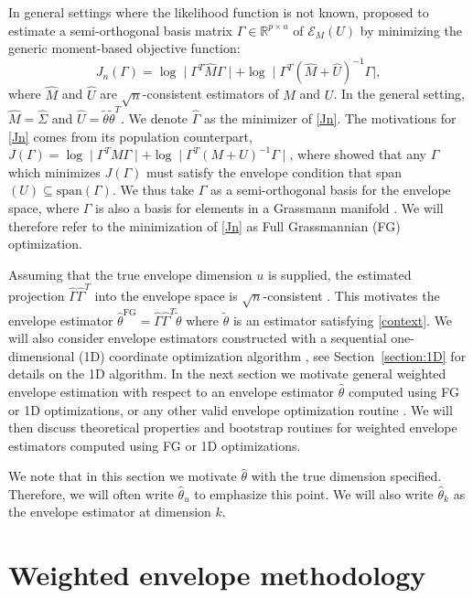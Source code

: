 \documentclass{article}\usepackage[]{graphicx}\usepackage[]{color}
\newcommand{\R}{\mathbb{R}}
\newcommand{\E}{\mathcal{E}}
\newcommand{\Mhat}{\widehat{M}}
\newcommand{\Uhat}{\widehat{U}}
\newcommand{\TFG}{\widehat{\theta}^{\text{FG}}}
\newcommand{\Ttil}{\widetilde{\theta}}
\newcommand{\rootn}{\sqrt{n}}
\begin{document}
In general settings where the likelihood function is not known, \citet{zhangmai} proposed to estimate a semi-orthogonal basis matrix $\Gamma \in \R^{p \times u}$ of $\E_M(U)$ by minimizing the generic moment-based objective function:
\begin{equation} \label{Jn}
  J_n(\Gamma) = \log\mid \Gamma^T\Mhat\Gamma \mid 
    + \log\mid \Gamma^T(\Mhat + \Uhat)^{-1}\Gamma \mid,
\end{equation}
where $\Mhat$ and $\Uhat$ are $\sqrt{n}$-consistent estimators of $M$ and $U$. In the general setting, $\Mhat = \widehat{\Sigma}$ and $\Uhat = \Ttil\Ttil^T$. We denote $\widehat{\Gamma}$ as the minimizer of \eqref{Jn}. The motivations for \eqref{Jn} comes from its population counterpart, $J(\Gamma) = \log\mid \Gamma^TM\Gamma \mid + \log\mid \Gamma^T(M + U)^{-1}\Gamma \mid$, where \citet{algo} showed that any $\Gamma$ which minimizes $J(\Gamma)$ must satisfy the envelope condition that span$(U) \subseteq \text{span}(\Gamma)$. We thus take $\Gamma$ as a semi-orthogonal basis for the envelope space, where $\Gamma$ is also a basis for elements in a Grassmann manifold \citep{algo}. We will therefore refer to the minimization of \eqref{Jn} as Full Grassmannian (FG) optimization.

Assuming that the true envelope dimension $u$ is supplied, the estimated projection $\widehat{\Gamma}\widehat{\Gamma}^T$ into the envelope space is $\rootn$-consistent \citep[Proposition 3]{algo}. This motivates the envelope estimator $\TFG =\widehat{\Gamma}\widehat{\Gamma}^T\Ttil$ where $\Ttil$ is an estimator satisfying \eqref{context}. We will also consider envelope estimators constructed with a sequential one-dimensional (1D) coordinate optimization algorithm \citep{algo, found}, see Section~\ref{section:1D} for details on the 1D algorithm. In the next section we motivate general weighted envelope estimation with respect to an envelope estimator $\hat\theta$ computed using FG or 1D optimizations, or any other valid envelope optimization routine \citep{fast-algo, lee2019Renvlp, zeng2019TRES}. We will then discuss theoretical properties and bootstrap routines for weighted envelope estimators computed using FG or 1D optimizations.

We note that in this section we motivate $\hat{\theta}$ with the true dimension specified. Therefore, we will often write $\hat{\theta}_u$ to emphasize this point. We will also write $\hat{\theta}_k$ as the envelope estimator at dimension $k$.


\section{Weighted envelope methodology}
\end{document}
